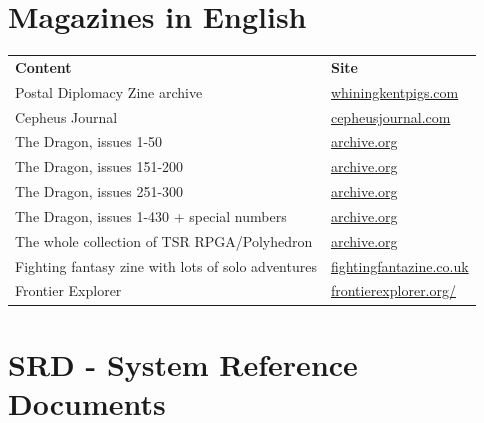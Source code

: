 \documentclass[a4paper, 11pt, twoside]{article}
\begin{document}
\section{Magazines in English}
\label{sec:org9e36b75}

\begin{longtable}{ll}
\textbf{Content} & \textbf{Site}\\
Postal Diplomacy Zine archive & \href{http://whiningkentpigs.com/DW/kent/diplomacyzinearchive.htm}{whiningkentpigs.com}\\
Cepheus Journal & \href{https://cepheusjournal.com/}{cepheusjournal.com}\\
The Dragon, issues 1-50 & \href{https://archive.org/details/DragonMagazine045\_201903}{archive.org}\\
The Dragon, issues 151-200 & \href{https://archive.org/details/DragonMagazine200\_201903/dragon\%2520151-200/Dragon\%2520Magazine\%2520\%2523151/page/n0/mode/2up}{archive.org}\\
The Dragon, issues 251-300 & \href{https://archive.org/details/DragonMagazine200\_201903/dragon\%2520151-200/Dragon\%2520Magazine\%2520\%2523151/page/n0/mode/2up}{archive.org}\\
The Dragon, issues 1-430 + special numbers & \href{https://archive.org/details/DragonMagazine260\_201801/Dragon\%2520Magazine\%2520430/mode/2up}{archive.org}\\
The whole collection of TSR RPGA/Polyhedron & \href{https://archive.org/details/Polyhedron105}{archive.org}\\
Fighting fantasy zine with lots of solo adventures & \href{http://www.fightingfantazine.co.uk/page/}{fightingfantazine.co.uk}\\
Frontier Explorer & \href{https://frontierexplorer.org/}{frontierexplorer.org/}\\
\end{longtable}

\section{SRD - System Reference Documents}
\label{sec:org02204f8}
\end{document}
